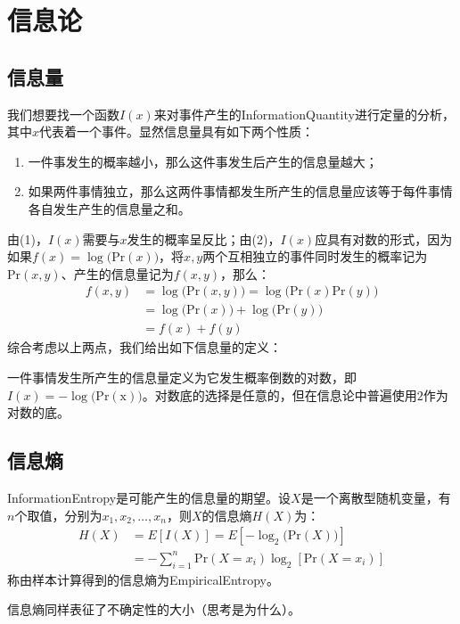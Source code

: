 \section{信息论}

\subsection{信息量}
我们想要找一个函数$I(x)$来对事件产生的\gls{InformationQuantity}进行定量的分析，其中$x$代表着一个事件。显然信息量具有如下两个性质：
\begin{enumerate}
	\item 一件事发生的概率越小，那么这件事发生后产生的信息量越大；
	\item 如果两件事情独立，那么这两件事情都发生所产生的信息量应该等于每件事情各自发生产生的信息量之和。
\end{enumerate}
由(1)，$I(x)$需要与$x$发生的概率呈反比；由(2)，$I(x)$应具有对数的形式，因为如果$f(x)=\log\Big(\mathrm{Pr}(x)\Big)$，将$x,y$两个互相独立的事件同时发生的概率记为$\mathrm{Pr}(x,y)$、产生的信息量记为$f(x,y)$，那么：
\begin{align*}
	f(x,y)&=\log\Big(\mathrm{Pr}(x,y)\Big)=\log\Big(\mathrm{Pr}(x)\mathrm{Pr}(y)\Big) \\
	&=\log\Big(\mathrm{Pr}(x)\Big)+\log\Big(\mathrm{Pr}(y)\Big) \\
	&=f(x)+f(y)
\end{align*}
综合考虑以上两点，我们给出如下信息量的定义：
\begin{definition}
	一件事情发生所产生的信息量定义为它发生概率倒数的对数，即$I(x)=-\log\Big(\mathrm{Pr(x)}\Big)$。对数底的选择是任意的，但在信息论中普遍使用$2$作为对数的底。
\end{definition}

\subsection{信息熵}
\begin{definition}
	\gls{InformationEntropy}是可能产生的信息量的期望。设$X$是一个离散型随机变量，有$n$个取值，分别为$x_1,x_2,\dots,x_n$，则$X$的信息熵$H(X)$为：
	\begin{align*}
		H(X)&=E[I(X)]=E\left[-\log_2\Big(\mathrm{Pr}(X)\Big)\right] \\
		&=-\sum_{i=1}^n\mathrm{Pr}(X=x_i)\log_2[\mathrm{Pr}(X=x_i)]
	\end{align*}
	称由样本计算得到的信息熵为\gls{EmpiricalEntropy}。
\end{definition}
信息熵同样表征了不确定性的大小（思考是为什么）。 

